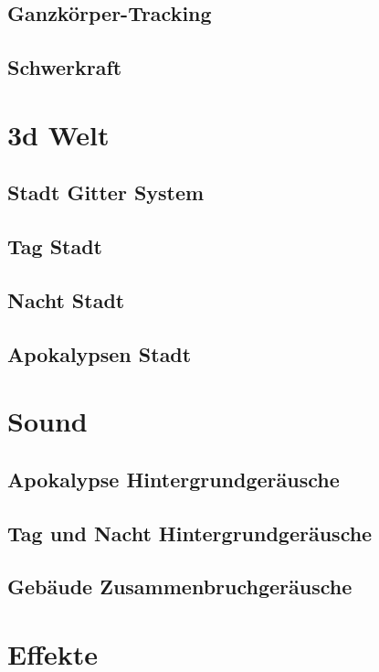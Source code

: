 \subsection{Ganzkörper-Tracking}\label{subsec:full-body-tracking}
\subsection{Schwerkraft}\label{subsec:gravity}
\section{3d Welt}\label{sec:3d-world}
\subsection{Stadt Gitter System}\label{subsec:city-grid-system}
\subsection{Tag Stadt}\label{subsec:day-city}
\subsection{Nacht Stadt}\label{subsec:night-city}
\subsection{Apokalypsen Stadt}\label{subsec:apocalypse-city}
\section{Sound}\label{sec:sound}
\subsection{Apokalypse Hintergrundgeräusche}\label{subsec:apocalypse-background-sound}
\subsection{Tag und Nacht Hintergrundgeräusche}\label{subsec:day-night-background-sound}
\subsection{Gebäude Zusammenbruchgeräusche}\label{subsec:building-collapse-sound}
\section{Effekte}\label{sec:effects}
